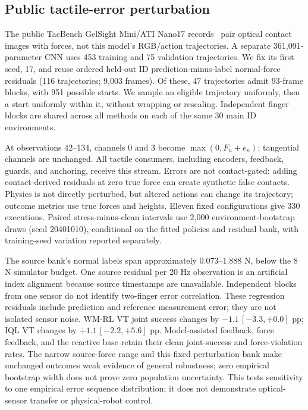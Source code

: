 \documentclass[letterpaper,10pt,conference]{ieeeconf}
\begin{document}
\subsection{Public tactile-error perturbation}
The public TacBench GelSight Mini/ATI Nano17 records~\cite{sparsh} pair
optical contact images with forces, not this model's RGB/action trajectories.
A separate 361,091-parameter CNN uses 453 training and 75 validation
trajectories. We fix its first seed, 17, and reuse ordered held-out ID
prediction-minus-label normal-force residuals (116 trajectories; 9,003 frames).
Of these, 47 trajectories admit 93-frame blocks, with 951 possible starts.
We sample an eligible trajectory uniformly, then a start uniformly within
it, without wrapping or rescaling. Independent finger blocks are shared
across all methods on each of the same 30 main ID environments.

At observations 42--134, channels 0 and 3 become
$\max(0,F_n+e_n)$; tangential channels are unchanged. All tactile consumers,
including encoders, feedback, guards, and anchoring, receive this stream.
Errors are not contact-gated: adding contact-derived residuals at zero true
force can create synthetic false contacts. Physics is not directly perturbed,
but altered actions can change its trajectory; outcome metrics use true forces
and heights. Eleven fixed configurations give 330 executions. Paired
stress-minus-clean intervals use 2,000 environment-bootstrap draws (seed
20401010), conditional on the fitted policies and residual bank, with
training-seed variation reported separately.

The source bank's normal labels span approximately 0.073--1.888 N, below
the 8 N simulator budget. One source residual per 20 Hz observation is
an artificial index alignment because source timestamps are unavailable.
Independent blocks from one sensor do not identify two-finger error
correlation. These regression residuals include prediction and reference
measurement error; they are not isolated sensor noise.
WM-RL VT joint success changes by \mbox{$-1.1\,[-3.3,+0.0]$} pp; IQL VT changes by \mbox{$+1.1\,[-2.2,+5.6]$} pp. Model-assisted feedback, force feedback, and the reactive base retain their clean joint-success and force-violation rates. The narrow source-force range and this fixed perturbation bank make unchanged outcomes weak evidence of general robustness; zero empirical bootstrap width does not prove zero population uncertainty. 
This tests sensitivity to one empirical error sequence distribution;
it does not demonstrate optical-sensor transfer or physical-robot control.
\end{document}

